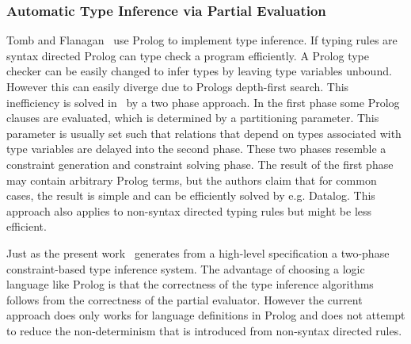 \subsubsection{Automatic Type Inference via Partial Evaluation}
Tomb and Flanagan~\cite{tomb2005automatic} use Prolog to implement
type inference. If typing rules are syntax directed Prolog can type
check a program efficiently. A Prolog type checker can be easily
changed to infer types by leaving type variables unbound. However this
can easily diverge due to Prologs depth-first search. This
inefficiency is solved in~\cite{tomb2005automatic} by a two phase
approach. In the first phase some Prolog clauses are evaluated, which
is determined by a partitioning parameter. This parameter is usually
set such that relations that depend on types associated with type
variables are delayed into the second phase. These two phases resemble
a constraint generation and constraint solving phase. The result of
the first phase may contain arbitrary Prolog terms, but the authors
claim that for common cases, the result is simple and can be
efficiently solved by e.g. Datalog. This approach also applies to
non-syntax directed typing rules but might be less efficient.

Just as the present work~\cite{tomb2005automatic} generates from a
high-level specification a two-phase constraint-based type inference
system. The advantage of choosing a logic language like Prolog is that
the correctness of the type inference algorithms follows from the
correctness of the partial evaluator. However the current approach
does only works for language definitions in Prolog and does not
attempt to reduce the non-determinism that is introduced from
non-syntax directed rules.

